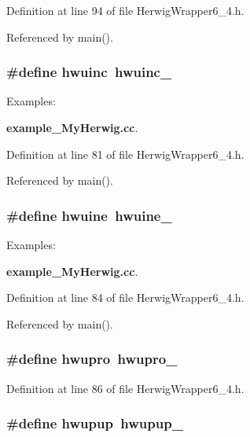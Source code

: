 Definition at line 94 of file Herwig\-Wrapper6\_\-4.h.

Referenced by main().
\subsubsection{\setlength{\rightskip}{0pt plus 5cm}\#define hwuinc~hwuinc\_\-}\label{HerwigWrapper6__4_8h_a6efae20082ef90024ccdd6665997dad}


\begin{Desc}
\item[Examples: ]\par
{\bf example\_\-My\-Herwig.cc}.\end{Desc}


Definition at line 81 of file Herwig\-Wrapper6\_\-4.h.

Referenced by main().
\subsubsection{\setlength{\rightskip}{0pt plus 5cm}\#define hwuine~hwuine\_\-}\label{HerwigWrapper6__4_8h_07d1d140b8b81e4391c7ccfa61aeebef}


\begin{Desc}
\item[Examples: ]\par
{\bf example\_\-My\-Herwig.cc}.\end{Desc}


Definition at line 84 of file Herwig\-Wrapper6\_\-4.h.

Referenced by main().
\subsubsection{\setlength{\rightskip}{0pt plus 5cm}\#define hwupro~hwupro\_\-}\label{HerwigWrapper6__4_8h_8bc67a52ad9b244833d734bfe1ca7952}




Definition at line 86 of file Herwig\-Wrapper6\_\-4.h.
\subsubsection{\setlength{\rightskip}{0pt plus 5cm}\#define hwupup~hwupup\_\-}\label{HerwigWrapper6__4_8h_50f398ec4347af0edf5eb180b67f88c9}




